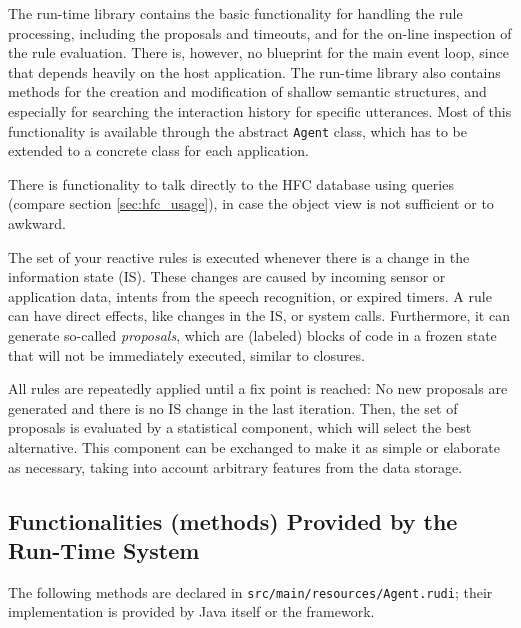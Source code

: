 The run-time library contains the basic functionality for handling the rule
processing, including the proposals and timeouts, and for the on-line
inspection of the rule evaluation. There is, however, no blueprint for the main
event loop, since that depends heavily on the host application. The run-time library also
contains methods for the creation and modification of shallow semantic
structures, and especially for searching the interaction history for specific
utterances. Most of this functionality is available through the abstract
\texttt{Agent} class, which has to be extended to a concrete class for each
application.

There is functionality to talk directly to the HFC database using queries (compare section \ref{sec:hfc_usage}), in
case the object view is not sufficient or to awkward.

The set of your reactive \vonda rules is executed whenever there is a change in the
information state (IS). These changes are caused by incoming sensor or
application data, intents from the speech recognition, or expired timers.
A rule can have direct effects,
like changes in the IS, or system calls. Furthermore, it can generate so-called
\emph{proposals}, which are (labeled) blocks of code in a frozen state that
will not be immediately executed, similar to closures.

All rules are repeatedly applied until a fix point is reached: No new proposals
are generated and there is no IS change in the last iteration. Then, the set of
proposals is evaluated by a statistical component, which will select the best
alternative. This component can be exchanged to make it as simple or elaborate
as necessary, taking into account arbitrary features from the data storage.

\subsection{Functionalities (methods) Provided by the Run-Time System}
The following methods are declared in \texttt{src/main/resources/Agent.rudi}; their implementation is provided by Java itself or the \vonda framework.

